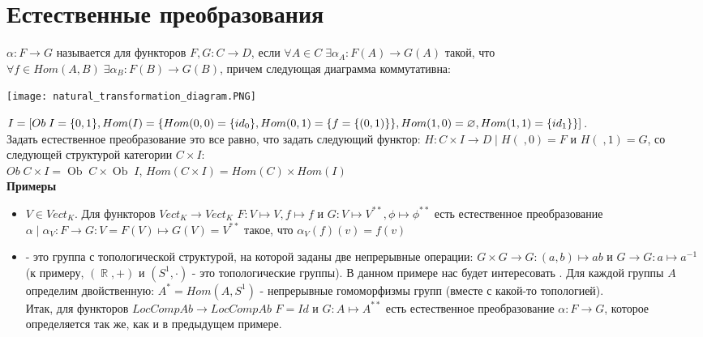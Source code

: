 \documentclass[a4paper]{article}
\theoremstyle{indented}
\theoremstyle{definition}
\theoremstyle{remark}
\DeclareMathOperator{\ra}{\rightarrow}
\DeclareMathOperator{\RR}{\mathbb{R}}
\DeclareMathOperator{\Ob}{Ob}
\begin{document}
\section{Естественные преобразования}
 $\alpha: F \ra G$ называется  для функторов $F, G: C \ra D$, если $\forall A \in C\;\exists \alpha_A: F(A) \ra G(A)$ такой, что \\
$\forall f \in Hom(A, B)\;\exists \alpha_B: F(B) \ra G(B)$, причем следующая диаграмма коммутативна:
\begin{center}
\texttt{[image: natural\_transformation\_diagram.PNG]}
\end{center}
\exer $I = [Ob\;I = \{0, 1\}, Hom(I) = \{Hom(0, 0) = \{id_0\}, \\
Hom(0, 1) = \{f = \{(0, 1)\}\}, Hom(1, 0) = \varnothing, Hom(1, 1) = \{id_1\}\}]$. \\
Задать естественное преобразование это все равно, что задать следующий функтор: $H: C \times I \ra D\;|\;H(\;, 0) = F$ и $H(\;, 1) = G$, со следующей структурой категории $C \times I$: \\
$Ob\;C\times I =\Ob\;C \times\Ob\;I$, $Hom(C \times I) = Hom(C) \times Hom(I)$ \\
\textbf{Примеры}
\begin{itemize}
    \item $V \in Vect_K$. Для функторов $Vect_K \ra Vect_K$ $F: V \mapsto V, f \mapsto f$ и $G: V \mapsto V^{**}, \phi \mapsto \phi^{**}$ есть естественное преобразование $\alpha\;|\;\alpha_V: F \ra G: V = F(V) \mapsto G(V) = V^{**}$ такое, что $\alpha_V(f)(v) = f(v)$
    \item {} - это группа с топологической структурой, на которой заданы две непрерывные операции: $G \times G \ra G : (a, b) \mapsto ab$ и $G \ra G : a \mapsto a^{-1}$ \\
    (к примеру, $(\RR, +)$ и $(S^1, \cdot)$ - это топологические группы). В данном примере нас будет интересовать . Для каждой группы $A$ определим двойственную: $A^* = Hom(A, S^1)$ - непрерывные гомоморфизмы групп (вместе с какой-то топологией). \\
    Итак, для функторов $LocCompAb \ra LocCompAb$ $F = Id$ и $G: A \mapsto A^{**}$ есть естественное преобразование $\alpha: F \ra G$, которое определяется так же, как и в предыдущем примере.
\end{itemize}
\end{document}
